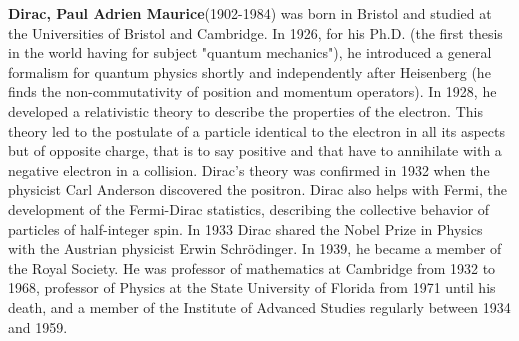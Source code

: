 \textbf{Dirac, Paul Adrien Maurice}(1902-1984) was born in Bristol and studied at the Universities of Bristol and Cambridge. In 1926, for his Ph.D. (the first thesis in the world having for subject "quantum mechanics"), he introduced a general formalism for quantum physics shortly and independently after Heisenberg (he finds the non-commutativity of position and momentum operators). In 1928, he developed a relativistic theory to describe the properties of the electron. This theory led to the postulate of a particle identical to the electron in all its aspects but of opposite charge, that is to say positive and that have to annihilate with a negative electron in a collision. Dirac's theory was confirmed in 1932 when the physicist Carl Anderson discovered the positron. Dirac also helps with Fermi, the development of the Fermi-Dirac statistics, describing the collective behavior of particles of half-integer spin. In 1933 Dirac shared the Nobel Prize in Physics with the Austrian physicist Erwin Schrödinger. In 1939, he became a member of the Royal Society. He was professor of mathematics at Cambridge from 1932 to 1968, professor of Physics at the State University of Florida from 1971 until his death, and a member of the Institute of Advanced Studies regularly between 1934 and 1959.

